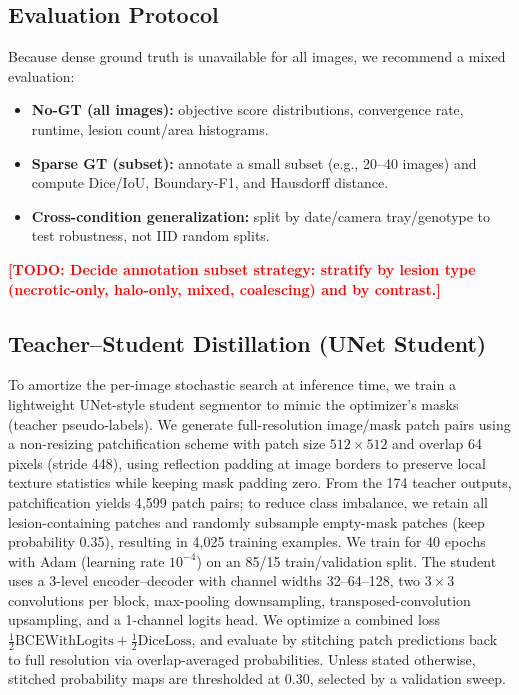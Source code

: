 \documentclass[journal]{IEEEtran}
\newcommand{\TODO}[1]{\textcolor{red}{\textbf{[TODO: #1]}}}
\begin{document}
\subsection{Evaluation Protocol}
Because dense ground truth is unavailable for all images, we recommend a mixed evaluation:
\begin{itemize}
    \item \textbf{No-GT (all images):} objective score distributions, convergence rate, runtime, lesion count/area histograms.
    \item \textbf{Sparse GT (subset):} annotate a small subset (e.g., 20--40 images) and compute Dice/IoU, Boundary-F1, and Hausdorff distance.
    \item \textbf{Cross-condition generalization:} split by date/camera tray/genotype to test robustness, not IID random splits.
\end{itemize}
\TODO{Decide annotation subset strategy: stratify by lesion type (necrotic-only, halo-only, mixed, coalescing) and by contrast.}

\subsection{Teacher--Student Distillation (UNet Student)}
To amortize the per-image stochastic search at inference time, we train a lightweight UNet-style student segmentor to mimic the optimizer's masks (teacher pseudo-labels).
We generate full-resolution image/mask patch pairs using a non-resizing patchification scheme with patch size $512\times512$ and overlap 64 pixels (stride 448), using reflection padding at image borders to preserve local texture statistics while keeping mask padding zero.
From the 174 teacher outputs, patchification yields 4{,}599 patch pairs; to reduce class imbalance, we retain all lesion-containing patches and randomly subsample empty-mask patches (keep probability 0.35), resulting in 4{,}025 training examples.
We train for 40 epochs with Adam (learning rate $10^{-4}$) on an 85/15 train/validation split.
The student uses a 3-level encoder--decoder with channel widths 32--64--128, two $3\times3$ convolutions per block, max-pooling downsampling, transposed-convolution upsampling, and a 1-channel logits head.
We optimize a combined loss $\tfrac12\mathrm{BCEWithLogits} + \tfrac12\mathrm{DiceLoss}$, and evaluate by stitching patch predictions back to full resolution via overlap-averaged probabilities. Unless stated otherwise, stitched probability maps are thresholded at 0.30, selected by a validation sweep.
\end{document}
